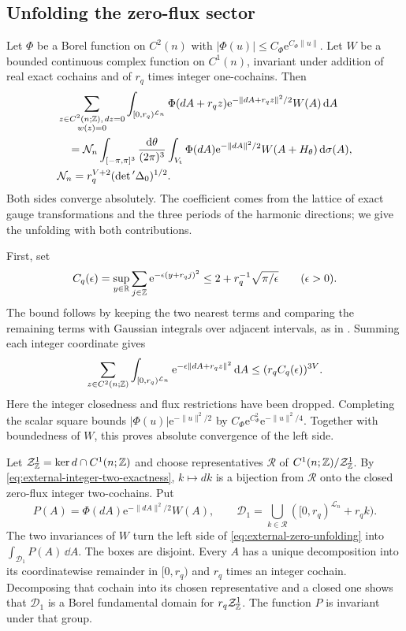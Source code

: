 \subsection{Unfolding the zero-flux sector}
\label{subsec:external-zero-flux}

Let $\Phi$ be a Borel function on $C^2(n)$ with
$|\Phi(u)|\le C_\Phi \mathrm e^{C_\Phi\|u\|}$.
Let $W$ be a bounded continuous complex function on
$C^1(n)$, invariant under addition of real exact cochains
and of $r_q$ times integer one-cochains. Then
\begin{align}
 &\sum_{\substack{z\in C^2(n;\mathbb Z),\,dz=0\\w(z)=0}}
       \int_{[0,r_q)^{\mathcal L_n}}
            \Phi(dA+r_qz)\mathrm e^{-\|dA+r_qz\|^2/2}W(A)\,\mathrm d A
       \notag\\
 &\quad=\mathcal N_n
       \int_{[-\pi,\pi]^3}\frac{\mathrm d\theta}{(2\pi)^3}
       \int_{V_{\mathrm t}}
              \Phi(dA)\mathrm e^{-\|dA\|^2/2}W(A+H_\theta)\,\mathrm d\sigma(A),
                                     \label{eq:external-zero-unfolding}\\
 &\mathcal N_n=r_q^{V+2}(\det{}'\Delta_0)^{1/2}.
                                     \label{eq:external-zero-normalization}
\end{align}
Both sides converge absolutely. The coefficient comes from
the lattice of exact gauge transformations and the three
periods of the harmonic directions; we give the unfolding
with both contributions.

First, set
\[
 C_q(\epsilon)=\sup_{y\in\mathbb R}\sum_{j\in\mathbb Z}
                  \mathrm e^{-\epsilon(y+r_qj)^2}
       \le2+r_q^{-1}\sqrt{\pi/\epsilon}\qquad(\epsilon>0).
\]
The bound follows by keeping the two nearest terms and comparing
the remaining terms with Gaussian integrals over adjacent intervals,
as in \cite[(5)]{ChamberLattice}. Summing each integer coordinate gives
\[
 \sum_{z\in C^2(n;\mathbb Z)}\int_{[0,r_q)^{\mathcal L_n}}
              \mathrm e^{-\epsilon\|dA+r_qz\|^2}\,\mathrm d A
                     \le(r_qC_q(\epsilon))^{3V}.
\]
Here the integer closedness and flux restrictions have
been dropped. Completing the scalar square bounds
$|\Phi(u)|\mathrm e^{-\|u\|^2/2}$ by
$C_\Phi \mathrm e^{C_\Phi^2}\mathrm e^{-\|u\|^2/4}$.
Together with boundedness of $W$, this proves absolute
convergence of the left side.

Let $\mathcal Z^1_{\mathbb Z}=\ker d\cap C^1(n;\mathbb Z)$ and
choose representatives $\mathcal R$ of
$C^1(n;\mathbb Z)/\mathcal Z^1_{\mathbb Z}$. By
\eqref{eq:external-integer-two-exactness}, $k\mapsto dk$
is a bijection from $\mathcal R$ onto the closed
zero-flux integer two-cochains. Put
\[
 P(A)=\Phi(dA)\mathrm e^{-\|dA\|^2/2}W(A),\qquad
 \mathcal D_1=\bigcup_{k\in\mathcal R}
                     ([0,r_q)^{\mathcal L_n}+r_qk).
\]
The two invariances of $W$ turn the left side of
\eqref{eq:external-zero-unfolding} into
$\int_{\mathcal D_1}P(A)\,\dd A$.
The boxes are disjoint. Every $A$ has a unique decomposition
into its coordinatewise remainder in $[0,r_q)$ and
$r_q$ times an integer cochain. Decomposing that cochain
into its chosen representative and a closed one shows
that $\mathcal D_1$ is a Borel fundamental domain for
$r_q\mathcal Z^1_{\mathbb Z}$. The function $P$ is invariant
under that group.

